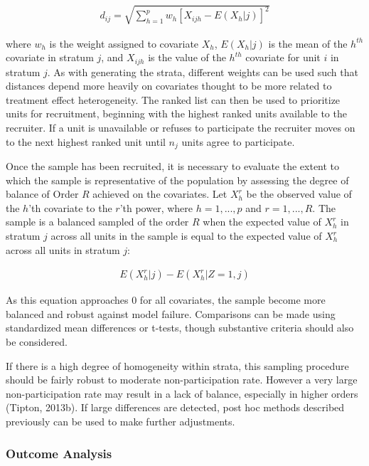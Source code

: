 \documentclass[man,floatsintext]{apa6}
\begin{document}
\begin{align} \label{eq:euclid}
  d_{ij} = \sqrt{\sum^p_{h=1}w_h[X_{ijh} - E(X_h|j)]^2}
\end{align}

where \(w_h\) is the weight assigned to covariate \(X_h\), \(E(X_h|j)\) is the mean of the \(h^{th}\) covariate in stratum \(j\), and \(X_{ijh}\) is the value of the \(h^{th}\) covariate for unit \(i\) in stratum \(j\). As with generating the strata, different weights can be used such that distances depend more heavily on covariates thought to be more related to treatment effect heterogeneity. The ranked list can then be used to prioritize units for recruitment, beginning with the highest ranked units available to the recruiter. If a unit is unavailable or refuses to participate the recruiter moves on to the next highest ranked unit until \(n_j\) units agree to participate.

Once the sample has been recruited, it is necessary to evaluate the extent to which the sample is representative of the population by assessing the degree of balance of Order \(R\) achieved on the covariates. Let \(X^r_h\) be the observed value of the \(h\)'th covariate to the \(r\)'th power, where \(h = {1, ..., p}\) and \(r = {1, ..., R}\). The sample is a balanced sampled of the order \(R\) when the expected value of \(X^r_h\) in stratum \(j\) across all units in the sample is equal to the expected value of \(X^r_h\) across all units in stratum \(j\):

\begin{align}
  E(X^r_h|j) - E(X^r_h|Z = 1, j)
\end{align}

As this equation approaches 0 for all covariates, the sample become more balanced and robust against model failure. Comparisons can be made using standardized mean differences or t-tests, though substantive criteria should also be considered.

If there is a high degree of homogeneity within strata, this sampling procedure should be fairly robust to moderate non-participation rate. However a very large non-participation rate may result in a lack of balance, especially in higher orders (Tipton, 2013b). If large differences are detected, post hoc methods described previously can be used to make further adjustments.

\hypertarget{outcome-analysis}{%
\subsubsection{Outcome Analysis}\label{outcome-analysis}}
\end{document}
